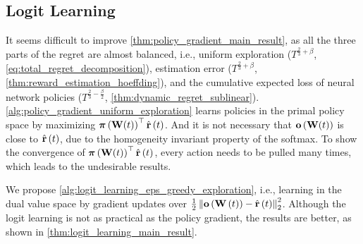 \subsection{Logit Learning}
\label{subsec:theoretical_analyses_logit_learning}

It seems difficult to improve \cref{thm:policy_gradient_main_result}, as all the three parts of the regret are almost balanced, i.e., uniform exploration ($ T^{\frac{2}{3} + \beta}$, \cref{eq:total_regret_decomposition}), estimation error ($ T^{\frac{2}{3} + \beta} $, \cref{thm:reward_estimation_hoeffding}), and the cumulative expected loss of neural network policies ($ T^{\frac{2}{3} - \frac{\beta}{2}} $, \cref{thm:dynamic_regret_sublinear}). \cref{alg:policy_gradient_uniform_exploration} learns policies in the primal policy space by maximizing ${\boldsymbol{\pi}}\left( {\mathbf{W}}(t) \right)^\top \hat{{\mathbf{r}}}\left(t\right)$. And it is not necessary that ${\mathbf{o}}\left( {\mathbf{W}}(t)\right)$ is close to $\hat{{\mathbf{r}}}\left(t\right)$, due to the homogeneity invariant property of the softmax. To show the convergence of ${\boldsymbol{\pi}}\left( {\mathbf{W}}(t) \right)^\top \hat{{\mathbf{r}}}\left(t\right)$, every action needs to be pulled many times, which leads to the undesirable results.

We propose \cref{alg:logit_learning_eps_greedy_exploration}, i.e., learning in the dual value space by gradient updates over $\frac{1}{2} \left\| {\mathbf{o}}\left( {\mathbf{W}}\left(t\right)\right) - \hat{{\mathbf{r}}}\left(t\right) \right\|_2^2$. Although the logit learning is not as practical as the policy gradient, the results are better, as shown in \cref{thm:logit_learning_main_result}.

